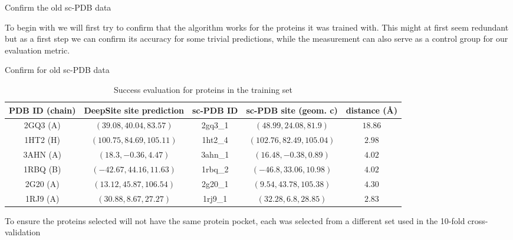 \documentclass{beamer}
\begin{document}
\begin{frame}{Confirm the old sc-PDB data}
  \begin{block}{}
    To begin with we will first try to confirm that the algorithm works for the proteins it was trained with.
    This might at first seem redundant but as a first step we can confirm its accuracy for some trivial predictions, while the measurement can also serve as a control group for our evaluation metric.
  \end{block}
\end{frame}

\begin{frame}{Confirm for old sc-PDB data}
  \begin{tiny}
  \begin{table}
  \caption{Success evaluation for proteins in the training set}
  \label{table:3}
  \begin{tabular}{ c | c | c | c | c }
    PDB ID (chain) & DeepSite site prediction & sc-PDB ID & sc-PDB site (geom. c) & distance (\AA) \\
    \hline
    2GQ3 (A) & $(39.08, 40.04, 83.57)$ & 2gq3\_1 & $(48.99, 24.08, 81.9)$ & $18.86$ \\
    1HT2 (H) & $(100.75, 84.69, 105.11)$ & 1ht2\_4 & $(102.76, 82.49, 105.04)$ & $2.98$ \\
    3AHN (A) & $(18.3, -0.36, 4.47)$ & 3ahn\_1 & $(16.48, -0.38, 0.89)$ & $4.02$ \\
    1RBQ (B) & $(-42.67, 44.16, 11.63)$ & 1rbq\_2 & $(-46.8, 33.06, 10.98)$ & $4.02$ \\
    2G20 (A) & $(13.12, 45.87, 106.54)$ & 2g20\_1 & $(9.54, 43.78, 105.38)$ & $4.30$ \\
    1RJ9 (A) & $(30.88, 8.67, 27.27)$ & 1rj9\_1 & $(32.28, 6.8, 28.85)$ & $2.83$ \\
  \end{tabular}
  \end{table}
  \end{tiny}
  To ensure the proteins selected will not have the same protein pocket, each was selected from a different set used in the 10-fold cross-validation
\end{frame}
\end{document}
